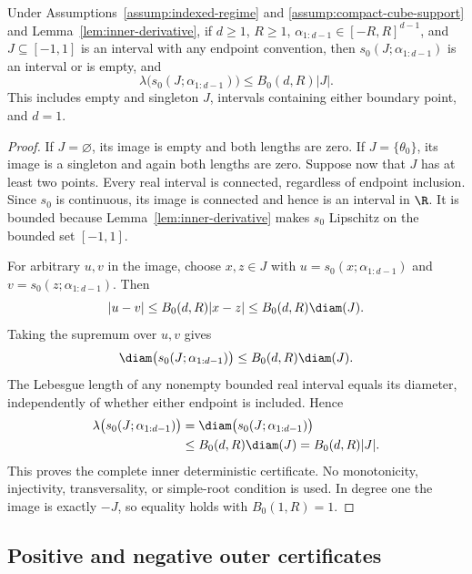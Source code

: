 \begin{lemma}
\label{lem:inner-image-length}
Under Assumptions~\ref{assump:indexed-regime} and
\ref{assump:compact-cube-support} and Lemma~\ref{lem:inner-derivative}, if
$d\geq1$, $R\geq1$, $\alpha_{1:d-1}\in[-R,R]^{d-1}$, and
$J\subseteq[-1,1]$ is an interval with any endpoint convention, then
$s_0(J;\alpha_{1:d-1})$ is an interval or is empty, and
\[
\lambda\bigl(s_0(J;\alpha_{1:d-1})\bigr)
\leq B_0(d,R)|J|.
\]
This includes empty and singleton $J$, intervals containing either boundary
point, and $d=1$.
\end{lemma}

\begin{proof}
If $J=\varnothing$, its image is empty and both lengths are zero.  If
$J=\{\theta_0\}$, its image is a singleton and again both lengths are zero.
Suppose now that $J$ has at least two points.  Every real interval is
connected, regardless of endpoint inclusion.  Since $s_0$ is continuous,
its image is connected and hence is an interval in $\R$.  It is bounded
because Lemma~\ref{lem:inner-derivative} makes $s_0$ Lipschitz on the bounded
set $[-1,1]$.

For arbitrary $u,v$ in the image, choose $x,z\in J$ with
$u=s_0(x;\alpha_{1:d-1})$ and $v=s_0(z;\alpha_{1:d-1})$.  Then
\[
|u-v|\leq B_0(d,R)|x-z|
\leq B_0(d,R)\diam(J).
\]
Taking the supremum over $u,v$ gives
\[
\diam\bigl(s_0(J;\alpha_{1:d-1})\bigr)
\leq B_0(d,R)\diam(J).
\]
The Lebesgue length of any nonempty bounded real interval equals its diameter,
independently of whether either endpoint is included.  Hence
\[
\begin{aligned}
\lambda\bigl(s_0(J;\alpha_{1:d-1})\bigr)
&=\diam\bigl(s_0(J;\alpha_{1:d-1})\bigr)\\
&\leq B_0(d,R)\diam(J)
=B_0(d,R)|J|.
\end{aligned}
\]
This proves the complete inner deterministic certificate.  No monotonicity,
injectivity, transversality, or simple-root condition is used.  In degree one
the image is exactly $-J$, so equality holds with $B_0(1,R)=1$.
\end{proof}

\subsection{Positive and negative outer certificates}
\label{app:outer-certificates}

